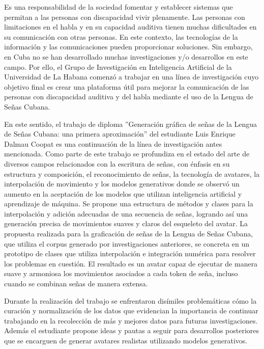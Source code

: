 \begin{opinion}
    Es una responsabilidad de la sociedad fomentar y establecer sistemas que permitan a las personas con discapacidad vivir plenamente. Las personas con limitaciones en el habla y en su capacidad auditiva tienen muchas dificultades en su comunicación con otras personas. En este contexto, las tecnologías de la información y las comunicaciones pueden proporcionar soluciones. Sin embargo, en Cuba no se han desarrollado muchas investigaciones y/o desarrollos en este campo. Por ello, el Grupo de Investigación en Inteligencia Artificial de la Universidad de La Habana comenzó a trabajar en una línea de investigación cuyo objetivo final es crear una plataforma útil para mejorar la comunicación de las personas con discapacidad auditiva y del habla mediante el uso de la Lengua de Señas Cubana.

En este sentido, el trabajo de diploma ''Generación gráfica de señas de la Lengua de Señas Cubana: una primera aproximación'' del estudiante Luis Enrique Dalmau Coopat es una continuación de la línea de investigación antes mencionada. Como parte de este trabajo se profundiza en el estado del arte de diversos campos relacionados con la escritura de señas, con énfasis en su estructura y composición, el reconocimiento de señas, la tecnología de avatares, la interpolación de movimiento y los modelos generativos donde se observó un aumento en la aceptación de los modelos que utilizan inteligencia artificial y aprendizaje de máquina. Se propone una estructura de métodos y clases para la interpolación y adición adecuadas de una secuencia de señas, logrando así una generación precisa de movimientos suaves y claros del esqueleto del avatar. La propuesta realizada para la graficación de señas de la Lengua de Señas Cubana, que utiliza el corpus generado por investigaciones anteriores, se concreta en un prototipo de clases que utiliza interpolación e integración numérica para resolver los problemas en cuestión. El resultado es un avatar capaz de ejecutar de manera suave y armoniosa los movimientos asociados a cada token de seña, incluso cuando se combinan señas de manera extensa.

Durante la realización del trabajo se enfrentaron disímiles problemáticas cómo la curación y normalización de los datos que evidencian la importancia de continuar trabajando en la recolección de más y mejores datos para futuras investigaciones. Además el estudiante propone ideas y pautas a seguir para desarrollos posteriores que se encarguen de generar avatares realistas utilizando modelos generativos.


\end{opinion}
